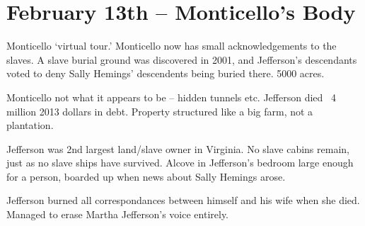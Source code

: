 \section{February 13th -- Monticello's Body}

Monticello `virtual tour.' Monticello now has small acknowledgements to the slaves. A slave burial ground was discovered in 2001, and Jefferson's descendants voted to deny Sally Hemings' descendents being buried there. 5000 acres.

Monticello not what it appears to be -- hidden tunnels etc. Jefferson died ~4 million 2013 dollars in debt. Property structured like a big farm, not a plantation.

Jefferson was 2nd largest land/slave owner in Virginia. No slave cabins remain, just as no slave ships have survived. Alcove in Jefferson's bedroom large enough for a person, boarded up when news about Sally Hemings arose.

Jefferson burned all correspondances between himself and his wife when she died. Managed to erase Martha Jefferson's voice entirely.